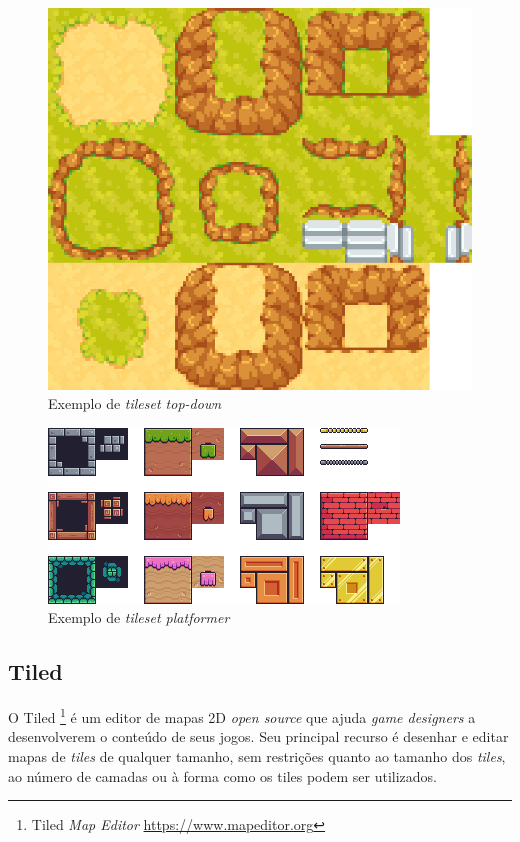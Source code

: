 \begin{figure}[h!]
    \centering
    \includegraphics[width=1\linewidth]{figuras/tileset.png}
    \caption{Exemplo de \textit{tileset top-down}}
    \label{fig:tileset-orthogonal}
\end{figure}
\begin{figure}[h!]
    \centering
    \includegraphics[width=1\linewidth]{figuras/tileset-orthogonal-platform.png}
    \caption{Exemplo de \textit{tileset platformer}}
    \label{fig:tileset-platform-orthogonal}
\end{figure}

\clearpage
\subsection{Tiled}
\label{sec:tiled}
O Tiled \footnote{Tiled \textit{Map Editor} \url{https://www.mapeditor.org}} é um editor de mapas 2D \textit{open source} que ajuda \textit{game designers} a desenvolverem o conteúdo de seus jogos. Seu principal recurso é desenhar e editar mapas de \textit{tiles} de qualquer tamanho, sem restrições quanto ao tamanho dos \textit{tiles}, ao número de camadas ou à forma como os tiles podem ser utilizados.

